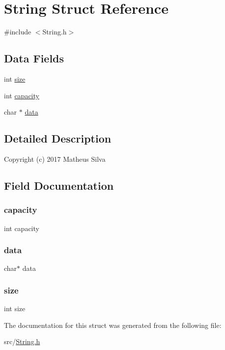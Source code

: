 \hypertarget{struct_string}{}\section{String Struct Reference}
\label{struct_string}


{\ttfamily \#include $<$String.\+h$>$}

\subsection*{Data Fields}
\begin{DoxyCompactItemize}
\item 
int \hyperlink{struct_string_a439227feff9d7f55384e8780cfc2eb82}{size}
\item 
int \hyperlink{struct_string_adbe66a087ac3fd4a5b0566f64ca2d12b}{capacity}
\item 
char $\ast$ \hyperlink{struct_string_a91a70b77df95bd8b0830b49a094c2acb}{data}
\end{DoxyCompactItemize}


\subsection{Detailed Description}
Copyright (c) 2017 Matheus Silva 

\subsection{Field Documentation}
\mbox{\label{struct_string_adbe66a087ac3fd4a5b0566f64ca2d12b}} 
\subsubsection{\texorpdfstring{capacity}{capacity}}
{\footnotesize\ttfamily int capacity}

\mbox{\label{struct_string_a91a70b77df95bd8b0830b49a094c2acb}} 
\subsubsection{\texorpdfstring{data}{data}}
{\footnotesize\ttfamily char$\ast$ data}

\mbox{\label{struct_string_a439227feff9d7f55384e8780cfc2eb82}} 
\subsubsection{\texorpdfstring{size}{size}}
{\footnotesize\ttfamily int size}



The documentation for this struct was generated from the following file\+:\begin{DoxyCompactItemize}
\item 
src/\hyperlink{_string_8h}{String.\+h}\end{DoxyCompactItemize}
